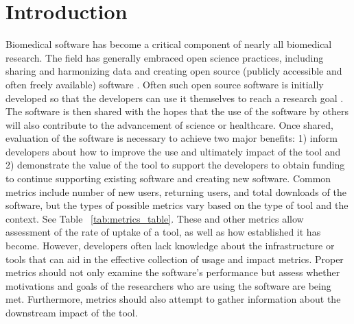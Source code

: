 \documentclass{article}
\begin{document}


\section{Introduction} Biomedical software has become a critical component of nearly all biomedical research.  The field has generally embraced open science practices, including sharing and harmonizing data and creating open source (publicly accessible and often freely available) software \cite{green_strategic_2020, levet_developing_2021, itcr_open-source_2021, merow_better_2023}. Often such open source software is initially developed so that the developers can use it themselves to reach a research goal \cite{bitzer_intrinsic_2007}. The software is then shared with the hopes that the use of the software by others will also contribute to the advancement of science or healthcare. Once shared, evaluation of the software is necessary to achieve two major benefits: 1) inform developers about how to improve the use and ultimately impact of the tool and 2) demonstrate the value of the tool to support the developers to obtain funding to continue supporting existing software and creating new software. Common metrics include number of new users, returning users, and total downloads of the software, but the types of possible metrics vary based on the type of tool and the context. See Table ~\ref{tab:metrics_table}. These and other metrics allow assessment of the rate of uptake of a tool, as well as how established it has become. However, developers often lack knowledge about the infrastructure or tools that can aid in the effective collection of usage and impact metrics. Proper metrics should not only examine the software's performance but assess whether motivations and goals of the researchers who are using the software are being met. Furthermore, metrics should also attempt to gather information about the downstream impact of the tool. 
\end{document}
